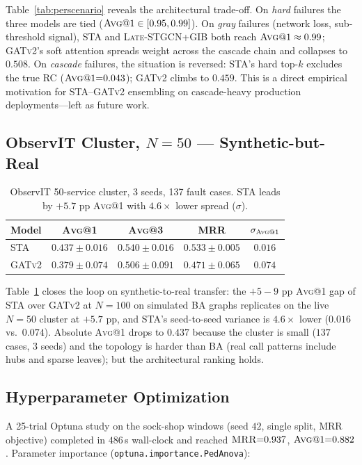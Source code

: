 \documentclass[11pt,a4paper]{article}
\makeatletter
\newcommand{\Avg}[1]{\textsc{Avg}@{#1}}
\newcommand{\MRR}{\textsc{MRR}}
\newcommand{\STA}{\textsc{STA}}
\newcommand{\GATv}{\textsc{GATv2}}
\newcommand{\Late}{\textsc{Late-STGCN+GIB}}
\makeatother
\begin{document}
Table~\ref{tab:perscenario} reveals the architectural trade-off. On
\emph{hard} failures the three models are tied ($\Avg{1} \in [0.95, 0.99]$).
On \emph{gray} failures (network loss, sub-threshold signal), \STA{} and
\Late{} both reach $\Avg{1} \approx 0.99$; \GATv{}'s soft attention spreads
weight across the cascade chain and collapses to $0.508$. On \emph{cascade}
failures, the situation is reversed: \STA{}'s hard top-$k$ excludes the true
RC ($\Avg{1}{=}0.043$); \GATv{} climbs to $0.459$. This is a direct
empirical motivation for \STA{}--\GATv{} ensembling on
cascade-heavy production deployments---left as future work.

\subsection{ObservIT Cluster, $N{=}50$ --- Synthetic-but-Real}

\begin{table}[h]
\centering\small
\begin{tabular}{lcccc}
\toprule
\textbf{Model} & \Avg{1} & \Avg{3} & \MRR{} & $\sigma_{\Avg{1}}$ \\
\midrule
\STA{}  & $\mathbf{0.437 \pm 0.016}$ & $\mathbf{0.540 \pm 0.016}$ & $\mathbf{0.533 \pm 0.005}$ & $0.016$ \\
\GATv{} & $0.379 \pm 0.074$ & $0.506 \pm 0.091$ & $0.471 \pm 0.065$ & $0.074$ \\
\bottomrule
\end{tabular}
\caption{ObservIT 50-service cluster, 3 seeds, 137 fault cases. \STA{} leads
by $+5.7$ pp \Avg{1} with $4.6\times$ lower spread ($\sigma$).}
\label{tab:n50}
\end{table}

Table~\ref{tab:n50} closes the loop on synthetic-to-real transfer: the
$+5{-}9$ pp \Avg{1} gap of \STA{} over \GATv{} at $N{=}100$ on simulated BA
graphs replicates on the live $N{=}50$ cluster at $+5.7$ pp, and \STA{}'s
seed-to-seed variance is $4.6\times$ lower ($0.016$ vs.\ $0.074$). Absolute
\Avg{1} drops to $0.437$ because the cluster is small ($137$ cases, $3$ seeds)
and the topology is harder than BA (real call patterns include hubs and
sparse leaves); but the architectural ranking holds.

\subsection{Hyperparameter Optimization}

A 25-trial Optuna study on the sock-shop windows (seed $42$, single split,
\MRR{} objective) completed in $486$\,s wall-clock and reached
$\MRR{}{=}0.937$, $\Avg{1}{=}0.882$. Parameter importance
(\texttt{optuna.importance.PedAnova}):
\end{document}
